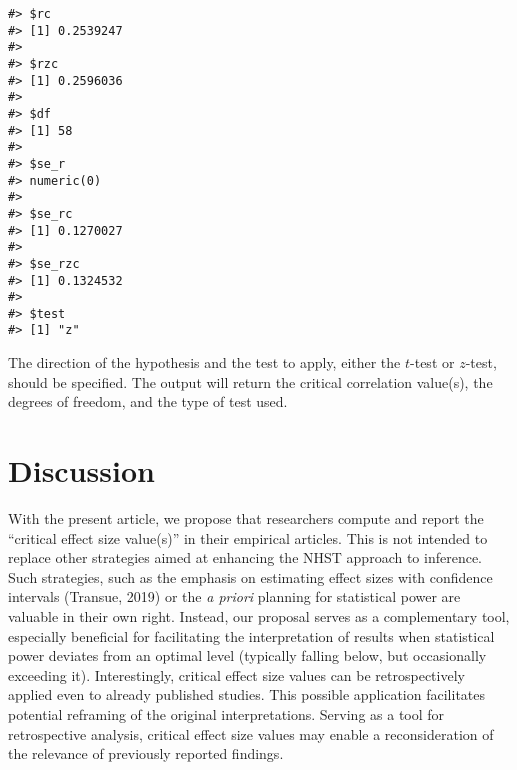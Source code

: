 \documentclass[
  man,floatsintext]{apa7}
\begin{document}
\begin{verbatim}
#> $rc
#> [1] 0.2539247
#> 
#> $rzc
#> [1] 0.2596036
#> 
#> $df
#> [1] 58
#> 
#> $se_r
#> numeric(0)
#> 
#> $se_rc
#> [1] 0.1270027
#> 
#> $se_rzc
#> [1] 0.1324532
#> 
#> $test
#> [1] "z"
\end{verbatim}

\normalsize

The direction of the hypothesis and the test to apply, either the \(t\)-test or \(z\)-test, should be specified. The output will return the critical correlation value(s), the degrees of freedom, and the type of test used.

\hypertarget{discussion}{%
\section{Discussion}\label{discussion}}

With the present article, we propose that researchers compute and report the ``critical effect size value(s)'' in their empirical articles. This is not intended to replace other strategies aimed at enhancing the NHST approach to inference. Such strategies, such as the emphasis on estimating effect sizes with confidence intervals (Transue, 2019) or the \textit{a priori} planning for statistical power are valuable in their own right. Instead, our proposal serves as a complementary tool, especially beneficial for facilitating the interpretation of results when statistical power deviates from an optimal level (typically falling below, but occasionally exceeding it). Interestingly, critical effect size values can be retrospectively applied even to already published studies. This possible application facilitates potential reframing of the original interpretations. Serving as a tool for retrospective analysis, critical effect size values may enable a reconsideration of the relevance of previously reported findings.
\end{document}
